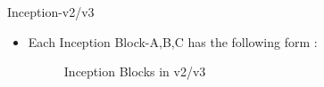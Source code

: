 \documentclass{beamer}
\begin{document}
\begin{frame}{Inception-v2/v3}
	\begin{itemize}
		\item Each Inception Block-A,B,C has the following form :
		\vspace{3pt}
		\begin{figure}[h]		
			\centering
			\quad
			\quad
			\caption{Inception Blocks in v2/v3}
			\label{Inception Blocks v2/v3}
		\end{figure}
	\end{itemize}
\end{frame}
\end{document}
